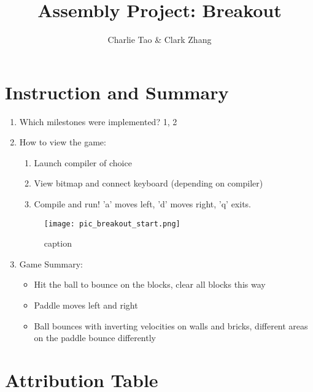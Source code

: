 \documentclass{article}
\title{Assembly Project: Breakout}
\author{Charlie Tao & Clark Zhang}
\begin{document}
\maketitle

\section{Instruction and Summary}

\begin{enumerate}

    \item Which milestones were implemented? 
    1, 2

    \item How to view the game:
    
    \begin{enumerate}

    \item Launch compiler of choice
    \item View bitmap and connect keyboard (depending on compiler)
    \item Compile and run! 'a' moves left, 'd' moves right, 'q' exits.


    \end{enumerate}

    

\begin{figure}[ht!]
    \centering
    \texttt{[image: pic\_breakout\_start.png]}
    \caption{caption}
    \label{Instructions}
\end{figure}

\item Game Summary:
\begin{itemize}
\item Hit the ball to bounce on the blocks, clear all blocks this way
\item Paddle moves left and right
\item Ball bounces with inverting velocities on walls and bricks, different areas on the paddle bounce differently
\end{itemize}

    
\end{enumerate}

\section{Attribution Table}
\end{document}
